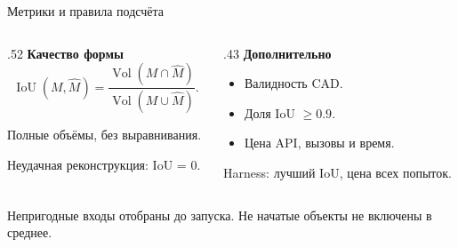 \documentclass[aspectratio=169,11pt]{beamer}
\newcommand{\source}[1]{\par\vfill{\fontsize{7.2}{8.8}\selectfont\color{Muted}#1\par}}
\newcommand{\smalltext}{\fontsize{9.7}{12}\selectfont}
\newcommand{\IoU}{\operatorname{IoU}}
\begin{document}
\begin{frame}{Метрики и правила подсчёта}\relax
\begin{columns}[T,onlytextwidth]
\begin{column}{.52\textwidth}
  \textbf{Качество формы}
  \[
  \IoU(M,\widehat M)=
  \frac{\operatorname{Vol}(M\cap\widehat M)}{\operatorname{Vol}(M\cup\widehat M)}.
  \]
  {\smalltext
  Полные объёмы, без выравнивания.
  \par\medskip
  Неудачная реконструкция: IoU = 0.}
\end{column}
\begin{column}{.43\textwidth}
  \textbf{Дополнительно}
  \begin{itemize}
    \item Валидность CAD.
    \item Доля IoU $\geq0.9$.
    \item Цена API, вызовы и время.
  \end{itemize}
  \par\smallskip
  {\smalltext Harness: лучший IoU, цена всех попыток.}
\end{column}
\end{columns}
\source{Непригодные входы отобраны до запуска. Не начатые объекты не включены в среднее.}
\end{frame}


\end{document}

